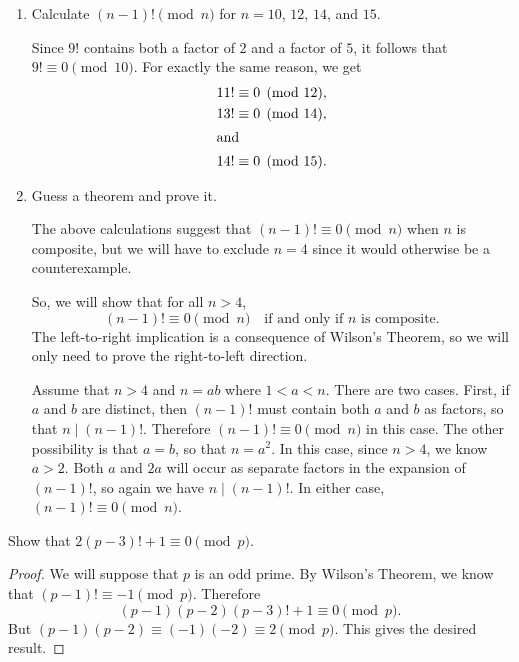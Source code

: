 \begin{enumerate}
\item Calculate $(n - 1)!\pmod{n}$ for $n = 10$, $12$, $14$, and $15$.
  \begin{solution}
    Since $9!$ contains both a factor of $2$ and a factor of $5$, it
    follows that $9!\equiv0\pmod{10}$. For exactly the same reason, we
    get
    \begin{align*}
      11!&\equiv0\pmod{12}, \\
      13!&\equiv0\pmod{14}, \\
      \intertext{and}
      14!&\equiv0\pmod{15}. \qedhere
    \end{align*}
  \end{solution}
\item Guess a theorem and prove it.
  \begin{solution}
    The above calculations suggest that $(n - 1)!\equiv0\pmod{n}$ when
    $n$ is composite, but we will have to exclude $n = 4$ since it
    would otherwise be a counterexample.

    So, we will show that for all $n > 4$,
    \begin{equation*}
      (n - 1)!\equiv0\pmod{n}
      \quad\text{if and only if $n$ is composite}.
    \end{equation*}
    The left-to-right implication is a consequence of Wilson's
    Theorem, so we will only need to prove the right-to-left
    direction.

    Assume that $n > 4$ and $n = ab$ where $1 < a < n$. There are two
    cases. First, if $a$ and $b$ are distinct, then $(n-1)!$ must
    contain both $a$ and $b$ as factors, so that $n\mid(n -
    1)!$. Therefore $(n-1)!\equiv0\pmod{n}$ in this case. The other
    possibility is that $a = b$, so that $n = a^2$. In this case,
    since $n > 4$, we know $a > 2$. Both $a$ and $2a$ will occur as
    separate factors in the expansion of $(n-1)!$, so again we have
    $n\mid(n-1)!$. In either case, $(n-1)!\equiv0\pmod{n}$.
  \end{solution}
\end{enumerate}

 Show that $2(p - 3)! + 1 \equiv 0 \pmod p$.
\begin{proof}
  We will suppose that $p$ is an odd prime. By Wilson's Theorem, we
  know that $(p - 1)!\equiv-1\pmod{p}$. Therefore
  \begin{equation*}
    (p - 1)(p - 2)(p - 3)! + 1 \equiv 0 \pmod{p}.
  \end{equation*}
  But $(p - 1)(p - 2)\equiv(-1)(-2)\equiv2\pmod{p}$. This gives the
  desired result.
\end{proof}

